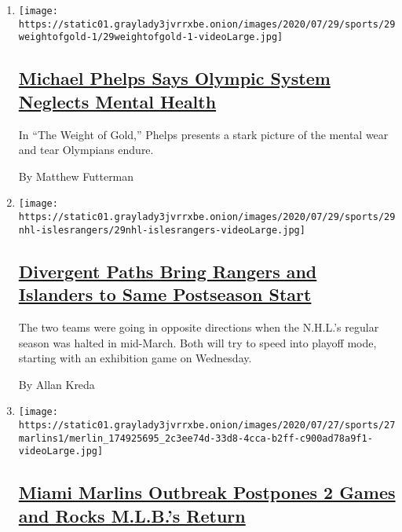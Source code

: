 \begin{enumerate}
\def\labelenumi{\arabic{enumi}.}
\item
  \texttt{[image: https://static01.graylady3jvrrxbe.onion/images/2020/07/29/sports/29weightofgold-1/29weightofgold-1-videoLarge.jpg]}

  \hypertarget{michael-phelps-says-olympic-system-neglects-mental-health}{%
  \subsection{\texorpdfstring{\href{/2020/07/29/sports/olympics/michael-phelps-documentary-weight-of-gold.html}{Michael
  Phelps Says Olympic System Neglects Mental
  Health}}{Michael Phelps Says Olympic System Neglects Mental Health}}\label{michael-phelps-says-olympic-system-neglects-mental-health}}

  In ``The Weight of Gold,'' Phelps presents a stark picture of the
  mental wear and tear Olympians endure.

  By Matthew Futterman
\item
  \texttt{[image: https://static01.graylady3jvrrxbe.onion/images/2020/07/29/sports/29nhl-islesrangers/29nhl-islesrangers-videoLarge.jpg]}

  \hypertarget{divergent-paths-bring-rangers-and-islanders-to-same-postseason-start}{%
  \subsection{\texorpdfstring{\href{/2020/07/29/sports/hockey/new-york-rangers-islanders-playoffs.html}{Divergent
  Paths Bring Rangers and Islanders to Same Postseason
  Start}}{Divergent Paths Bring Rangers and Islanders to Same Postseason Start}}\label{divergent-paths-bring-rangers-and-islanders-to-same-postseason-start}}

  The two teams were going in opposite directions when the N.H.L.'s
  regular season was halted in mid-March. Both will try to speed into
  playoff mode, starting with an exhibition game on Wednesday.

  By Allan Kreda
\item
  \texttt{[image: https://static01.graylady3jvrrxbe.onion/images/2020/07/27/sports/27marlins1/merlin\_174925695\_2c3ee74d-33d8-4cca-b2ff-c900ad78a9f1-videoLarge.jpg]}

  \hypertarget{miami-marlins-outbreak-postpones-2-games-and-rocks-mlbs-return}{%
  \subsection{\texorpdfstring{\href{/2020/07/27/sports/baseball/marlins-game-canceled.html}{Miami
  Marlins Outbreak Postpones 2 Games and Rocks M.L.B.'s
  Return}}{Miami Marlins Outbreak Postpones 2 Games and Rocks M.L.B.'s Return}}\label{miami-marlins-outbreak-postpones-2-games-and-rocks-mlbs-return}}


\end{enumerate}
